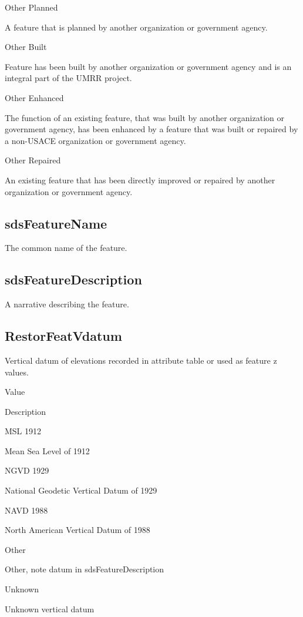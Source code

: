 \documentclass[
  letterpaper,
  DIV=11,
  numbers=noendperiod]{scrreprt}
\begin{document}
Other Planned

A feature that is planned by another organization or government agency.

Other Built

Feature has been built by another organization or government agency and
is an integral part of the UMRR project.

Other Enhanced

The function of an existing feature, that was built by another
organization or government agency, has been enhanced by a feature that
was built or repaired by a non-USACE organization or government agency.

Other Repaired

An existing feature that has been directly improved or repaired by
another organization or government agency.

\subsection{sdsFeatureName}\label{sdsfeaturename-22}

The common name of the feature.

\subsection{sdsFeatureDescription}\label{sdsfeaturedescription-22}

A narrative describing the feature.

\subsection{RestorFeatVdatum}\label{restorfeatvdatum-22}

Vertical datum of elevations recorded in attribute table or used as
feature z values.

Value

Description

MSL 1912

Mean Sea Level of 1912

NGVD 1929

National Geodetic Vertical Datum of 1929

NAVD 1988

North American Vertical Datum of 1988

Other

Other, note datum in sdsFeatureDescription

Unknown

Unknown vertical datum
\end{document}
